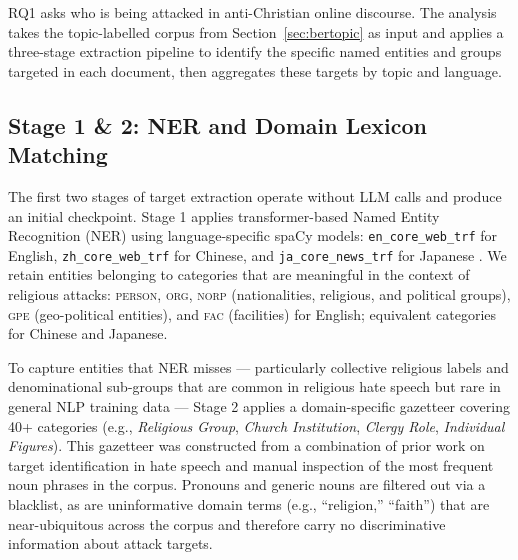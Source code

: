 \documentclass[../CLthesis.tex]{subfiles}
\begin{document}
RQ1 asks who is being attacked in anti-Christian online discourse. The analysis takes the topic-labelled corpus from Section~\ref{sec:bertopic} as input and applies a three-stage extraction pipeline to identify the specific named entities and groups targeted in each document, then aggregates these targets by topic and language.

\subsection{Stage 1 \& 2: NER and Domain Lexicon Matching}

The first two stages of target extraction operate without LLM calls and produce an initial checkpoint. Stage 1 applies transformer-based Named Entity Recognition (NER) using language-specific spaCy models: \texttt{en\_core\_web\_trf} for English, \texttt{zh\_core\_web\_trf} for Chinese, and \texttt{ja\_core\_news\_trf} for Japanese \citep{honnibal2017spacy}. We retain entities belonging to categories that are meaningful in the context of religious attacks: \textsc{person}, \textsc{org}, \textsc{norp} (nationalities, religious, and political groups), \textsc{gpe} (geo-political entities), and \textsc{fac} (facilities) for English; equivalent categories for Chinese and Japanese.

To capture entities that NER misses — particularly collective religious labels and denominational sub-groups that are common in religious hate speech but rare in general NLP training data — Stage 2 applies a domain-specific gazetteer covering 40+ categories (e.g., \textit{Religious Group}, \textit{Church Institution}, \textit{Clergy Role}, \textit{Individual Figures}). This gazetteer was constructed from a combination of prior work on target identification in hate speech \citep{yoder_how_2022, thomson_identity-based_2021} and manual inspection of the most frequent noun phrases in the corpus. Pronouns and generic nouns are filtered out via a blacklist, as are uninformative domain terms (e.g., ``religion,'' ``faith'') that are near-ubiquitous across the corpus and therefore carry no discriminative information about attack targets.
\end{document}
